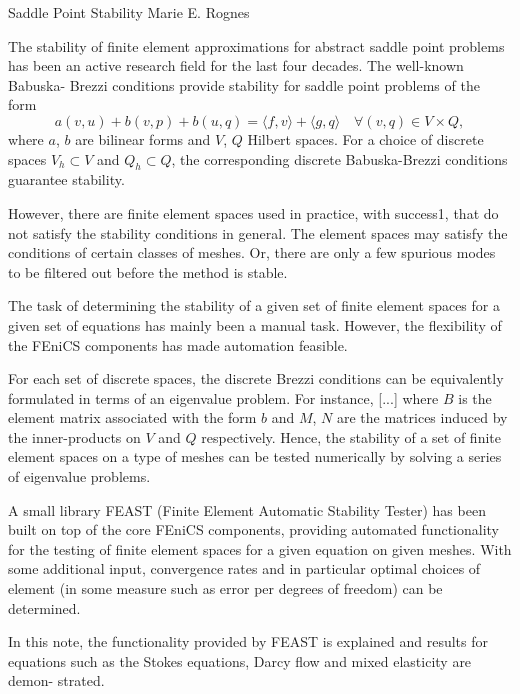              {Saddle Point Stability}
              {Marie E. Rognes}

\editornote{[rognes]}

The stability of finite element approximations for abstract saddle point problems
has been an active research field for the last four decades. The well-known Babuska-
Brezzi conditions provide stability for saddle point problems of the form
\begin{equation}
  a(v, u) + b(v, p) + b(u, q) = \langle f, v \rangle + \langle g, q \rangle
  \quad \forall (v, q) \in V \times Q,
\end{equation}
where $a$, $b$ are bilinear forms and $V$, $Q$ Hilbert spaces. For a
choice of discrete spaces $V_h \subset V$ and $Q_h \subset Q$, the
corresponding discrete Babuska-Brezzi conditions guarantee stability.

However, there are finite element spaces used in practice, with
success1, that do not satisfy the stability conditions in general. The
element spaces may satisfy the conditions of certain classes of
meshes. Or, there are only a few spurious modes to be filtered out
before the method is stable.

The task of determining the stability of a given set of finite
element spaces for a given set of equations has mainly been a manual
task. However, the flexibility of the FEniCS components has made
automation feasible.

For each set of discrete spaces, the discrete Brezzi conditions can be
equivalently formulated in terms of an eigenvalue problem. For
instance, [...]  where $B$ is the element matrix associated with the
form $b$ and $M$, $N$ are the matrices induced by the inner-products
on $V$ and $Q$ respectively. Hence, the stability of a set of finite
element spaces on a type of meshes can be tested numerically by
solving a series of eigenvalue problems.

A small library FEAST (Finite Element Automatic Stability Tester) has
been built on top of the core FEniCS components, providing automated
functionality for the testing of finite element spaces for a given
equation on given meshes. With some additional input, convergence
rates and in particular optimal choices of element (in some measure
such as error per degrees of freedom) can be determined.

In this note, the functionality provided by FEAST is explained and
results for equations such as the Stokes equations, Darcy flow and
mixed elasticity are demon- strated.
